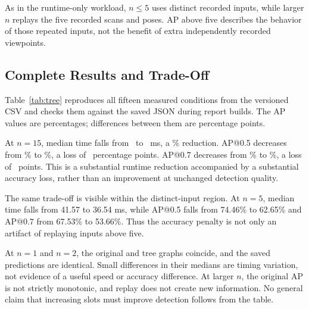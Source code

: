 As in the runtime-only workload, $n\leq5$ uses distinct recorded inputs,
while larger $n$ replays the five recorded scans and poses. AP above five
describes the behavior of those repeated inputs, not the benefit of extra
independently recorded viewpoints.

\subsection{Complete Results and Trade-Off}
Table~\ref{tab:tree} reproduces all fifteen measured conditions from the
versioned CSV and checks them against the saved JSON during report builds.
The AP values are percentages; differences between them are percentage points.

\begin{table}[htbp]
\centering
\caption{Matched Original/Tree comparison on 30 ego-1 views. Below the rule
after $n=5$, additional slots replay the five recorded inputs. The table is
separate from the full-test benchmark and the runtime-only sweep.}
\label{tab:tree}

\end{table}

At $n=15$, median time falls from \ReportOriginalTime\ to \ReportTreeTime\ ms,
a \ReportTreeReduction\% reduction. AP@0.5 decreases from
\ReportOriginalAPFifty\% to \ReportTreeAPFifty\%, a loss of
\ReportTreeDropFifty\ percentage points. AP@0.7 decreases from
\ReportOriginalAPSeventy\% to \ReportTreeAPSeventy\%, a loss of
\ReportTreeDropSeventy\ points. This is a substantial runtime reduction
accompanied by a substantial accuracy loss, rather than an improvement at
unchanged detection quality.

The same trade-off is visible within the distinct-input region. At $n=5$,
median time falls from 41.57 to 36.54 ms, while AP@0.5 falls from 74.46\% to
62.65\% and AP@0.7 from 67.53\% to 53.66\%. Thus the accuracy penalty is not
only an artifact of replaying inputs above five.

At $n=1$ and $n=2$, the original and tree graphs coincide, and the saved
predictions are identical. Small differences in their medians are timing
variation, not evidence of a useful speed or accuracy difference. At larger
$n$, the original AP is not strictly monotonic, and replay does not create
new information. No general claim that increasing slots must improve
detection follows from the table.
